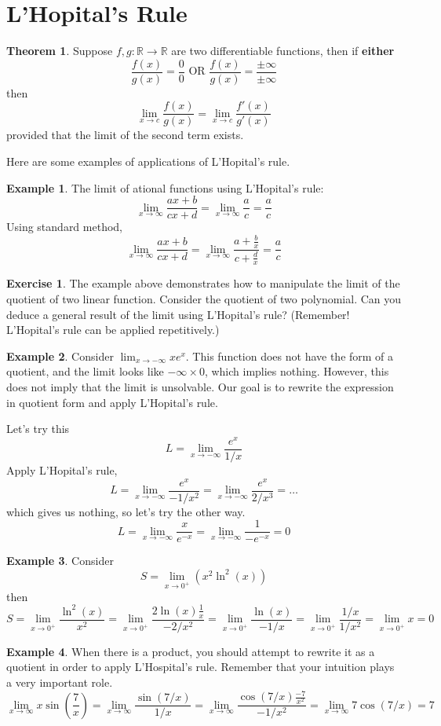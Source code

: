 \documentclass{article}
\theoremstyle{definition}
\theoremstyle{definition}
\theoremstyle{definition}
\theoremstyle{definition}
\theoremstyle{definition}
\theoremstyle{definition}
\newtheorem{example}{Example}
\theoremstyle{definition}
\theoremstyle{definition}
\theoremstyle{definition}
\newtheorem{exercise}{Exercise}
\newtheorem{theorem}{Theorem}[section]
\begin{document}
\section{L'Hopital's Rule}
\begin{theorem}
Suppose $f,g:\mathbb{R}\to\mathbb{R}$ are two differentiable functions, then if \textbf{either} 
\[\dfrac{f(x)}{g(x)}=\dfrac{0}{0}\text{ OR }\dfrac{f(x)}{g(x)}=\dfrac{\pm\infty}{\pm\infty}\]
then 
\[\lim_{x\to c}\dfrac{f(x)}{g(x)}=\lim_{x\to c}\dfrac{f'(x)}{g'(x)}\]
provided that the limit of the second term exists.
\end{theorem}
Here are some examples of applications of L'Hopital's rule.
\begin{example}
The limit of ational functions using L'Hopital's rule:
\[
\lim_{x\to\infty}\dfrac{ax+b}{cx+d}=\lim_{x\to \infty}\dfrac{a}{c}=\dfrac{a}{c}
\]
Using standard method,
\[
\lim_{x\to\infty}\dfrac{ax+b}{cx+d}=\lim_{x\to \infty}\dfrac{a+\frac{b}{x}}{c+\frac{d}{x}}=\dfrac{a}{c}
\]
\end{example}
\begin{exercise}
The example above demonstrates how to manipulate the limit of the quotient of two linear function. Consider the quotient of two polynomial. Can you deduce a general result of the limit using L'Hopital's rule? (Remember! L'Hopital's rule can be applied repetitively.)
\end{exercise}
\begin{example}
Consider $\lim_{x\to -\infty}xe^x$. This function does not have the form of a quotient, and the limit looks like $-\infty\times 0$, which implies nothing. However, this does not imply that the limit is unsolvable. Our goal is to rewrite the expression in quotient form and apply L'Hopital's rule.

Let's try this
\[L=\lim_{x\to-\infty}\dfrac{e^x}{1/x}\]
Apply L'Hopital's rule,
\[
L=\lim_{x\to-\infty}\dfrac{e^x}{-1/x^2}=\lim_{x\to-\infty}\dfrac{e^x}{2/x^3}=\ldots
\]
which gives us nothing, so let's try the other way.
\[L=\lim_{x\to-\infty}\dfrac{x}{e^{-x}}=\lim_{x\to-\infty}\dfrac{1}{-e^{-x}}=0\]
\end{example}
\begin{example}
Consider $$S=\lim_{x\to 0^+}(x^2\ln^2(x))$$ then
\[
S=\lim_{x\to0^+}\dfrac{\ln^2(x)}{x^2}=\lim_{x\to 0^+}\dfrac{2\ln(x)\frac{1}{x}}{-2/x^2}=\lim_{x\to 0^+}\dfrac{\ln(x)}{-1/x}=\lim_{x\to 0^+}\dfrac{1/x}{1/x^2}=\lim_{x\to 0^+}x=0\]
\end{example}
\begin{example}
When there is a product, you should attempt to rewrite it as a quotient in order to apply L'Hospital's rule. Remember that your intuition plays a very important role.
\[
\lim_{x\to\infty}x\sin\left(\dfrac{7}{x}\right)=\lim_{x\to\infty}\dfrac{\sin(7/x)}{1/x}=\lim_{x\to\infty}\dfrac{\cos(7/x)\frac{-7}{x^2}}{-1/x^2}=\lim_{x\to\infty}7\cos(7/x)=7
\]
\end{example}
\end{document}
